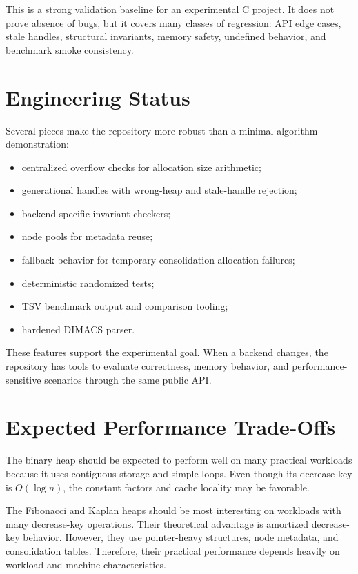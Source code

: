 This is a strong validation baseline for an experimental C project.
It does not prove absence of bugs, but it covers many classes of regression: API edge cases, stale handles, structural invariants, memory safety, undefined behavior, and benchmark smoke consistency.

\section{Engineering Status}

Several pieces make the repository more robust than a minimal algorithm demonstration:

\begin{itemize}
    \item centralized overflow checks for allocation size arithmetic;
    \item generational handles with wrong-heap and stale-handle rejection;
    \item backend-specific invariant checkers;
    \item node pools for metadata reuse;
    \item fallback behavior for temporary consolidation allocation failures;
    \item deterministic randomized tests;
    \item TSV benchmark output and comparison tooling;
    \item hardened DIMACS parser.
\end{itemize}

These features support the experimental goal.
When a backend changes, the repository has tools to evaluate correctness, memory behavior, and performance-sensitive scenarios through the same public API.

\section{Expected Performance Trade-Offs}

The binary heap should be expected to perform well on many practical workloads because it uses contiguous storage and simple loops.
Even though its decrease-key is $O(\log n)$, the constant factors and cache locality may be favorable.

The Fibonacci and Kaplan heaps should be most interesting on workloads with many decrease-key operations.
Their theoretical advantage is amortized decrease-key behavior.
However, they use pointer-heavy structures, node metadata, and consolidation tables.
Therefore, their practical performance depends heavily on workload and machine characteristics.

